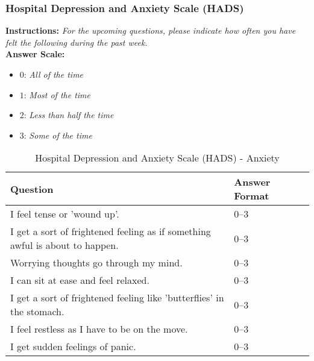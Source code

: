 \subsubsection{Hospital Depression and Anxiety Scale (HADS)}
\textbf{Instructions:} \emph{For the upcoming questions, please indicate how often you have felt the following during the past week.}
\\
\textbf{Answer Scale:}
\begin{itemize}
    \item $0$: \emph{All of the time}
    \item $1$: \emph{Most of the time}
    \item $2$: \emph{Less than half the time}
    \item $3$: \emph{Some of the time}
\end{itemize}
\begin{table}[H]
    \centering
    \renewcommand{\arraystretch}{1.2}
    \begin{tabularx}{\textwidth}{|l|X|l|}
        \hline
        \textbf{Question} & \textbf{Answer Format} \\ \hline
        I feel tense or 'wound up'. & 0--3 \\ \hline
        I get a sort of frightened feeling as if something awful is about to happen. & 0--3 \\ \hline
        Worrying thoughts go through my mind. & 0--3 \\ \hline
        I can sit at ease and feel relaxed. & 0--3 \\ \hline
        I get a sort of frightened feeling like 'butterflies' in the stomach. & 0--3 \\ \hline
        I feel restless as I have to be on the move. & 0--3 \\ \hline
        I get sudden feelings of panic. & 0--3 \\ \hline
    \end{tabularx}
    \caption{Hospital Depression and Anxiety Scale (HADS) - Anxiety}
    \label{tab:hads-anxiety}
\end{table}

